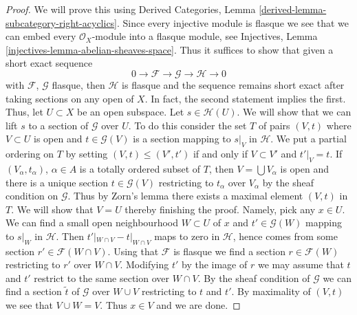 \begin{proof}
We will prove this using
Derived Categories, Lemma \ref{derived-lemma-subcategory-right-acyclics}.
Since every injective module is flasque we see that we can embed
every $\mathcal{O}_X$-module into a flasque module, see
Injectives, Lemma \ref{injectives-lemma-abelian-sheaves-space}.
Thus it suffices to show that given a short exact sequence
$$
0 \to \mathcal{F} \to \mathcal{G} \to \mathcal{H} \to 0
$$
with $\mathcal{F}$, $\mathcal{G}$ flasque, then $\mathcal{H}$
is flasque and the sequence remains short exact after taking sections
on any open of $X$. In fact, the second statement implies the first.
Thus, let $U \subset X$ be an open subspace. Let $s \in \mathcal{H}(U)$.
We will show that we can lift $s$ to a section of $\mathcal{G}$
over $U$. To do this consider the set $T$ of pairs $(V, t)$
where $V \subset U$ is open and $t \in \mathcal{G}(V)$ is a section
mapping to $s|_V$ in $\mathcal{H}$.
We put a partial ordering on $T$ by setting
$(V, t) \leq (V', t')$ if and only if $V \subset V'$ and $t'|_V = t$.
If $(V_\alpha, t_\alpha)$, $\alpha \in A$
is a totally ordered subset of $T$, then $V = \bigcup V_\alpha$
is open and there is a unique section $t \in \mathcal{G}(V)$
restricting to $t_\alpha$ over $V_\alpha$ by the sheaf condition on
$\mathcal{G}$. Thus by Zorn's lemma there exists a maximal element
$(V, t)$ in $T$. We will show that $V = U$ thereby finishing the proof.
Namely, pick any $x \in U$. We can find a small open neighbourhood
$W \subset U$ of $x$ and $t' \in \mathcal{G}(W)$ mapping to $s|_W$
in $\mathcal{H}$. Then $t'|_{W \cap V} - t|_{W \cap V}$ maps to
zero in $\mathcal{H}$, hence comes from some section
$r' \in \mathcal{F}(W \cap V)$. Using that $\mathcal{F}$ is flasque
we find a section $r \in \mathcal{F}(W)$ restricting to $r'$
over $W \cap V$. Modifying $t'$ by the image of $r$ we may
assume that $t$ and $t'$ restrict to the same section over
$W \cap V$. By the sheaf condition of $\mathcal{G}$
we can find a section $\tilde t$ of $\mathcal{G}$ over
$W \cup V$ restricting to $t$ and $t'$.
By maximality of $(V, t)$ we see that $V \cup W = V$.
Thus $x \in V$ and we are done.
\end{proof}

